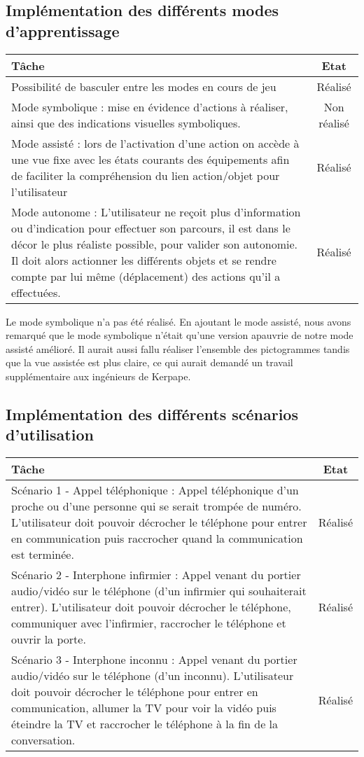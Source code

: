 \subsection{Implémentation des différents modes d'apprentissage}
\begin{tabular}{|p{13cm}|c|}
	\hline
	Tâche & Etat \\ \hline
	Possibilité de basculer entre les modes en cours de jeu & Réalisé \\ \hline
	Mode symbolique : mise en évidence d'actions à réaliser, ainsi que des indications visuelles symboliques. & Non réalisé \\ \hline
	Mode assisté : lors de l'activation d'une action on accède à une vue fixe avec les états courants des équipements afin de faciliter la compréhension du lien action/objet pour l'utilisateur & Réalisé \\ \hline
	Mode autonome : L'utilisateur ne reçoit plus d'information ou d'indication pour effectuer son parcours, il est dans le décor le plus réaliste possible, pour valider son autonomie. Il doit alors actionner les différents objets et se rendre compte par lui même (déplacement) des actions qu'il a effectuées.  & Réalisé \\ \hline
\end{tabular}
Le mode symbolique n'a pas été réalisé. En ajoutant le mode assisté, nous avons remarqué que le mode symbolique n'était qu'une version apauvrie de notre mode assisté amélioré. Il aurait aussi fallu réaliser l'ensemble des pictogrammes tandis que la vue assistée est plus claire, ce qui aurait demandé un travail supplémentaire aux ingénieurs de Kerpape.

\subsection{Implémentation des différents scénarios d'utilisation}		
\begin{tabular}{|p{13cm}|c|}
	\hline
	Tâche & Etat \\ \hline
	Scénario 1 - Appel téléphonique : Appel téléphonique d'un proche ou d'une personne qui se serait trompée de numéro. L'utilisateur doit pouvoir décrocher le téléphone pour entrer en communication puis raccrocher quand la communication est terminée. & Réalisé \\ \hline
	Scénario 2 - Interphone infirmier : Appel venant du portier audio/vidéo sur le téléphone (d'un infirmier qui souhaiterait entrer). L'utilisateur doit pouvoir décrocher le téléphone, communiquer avec l'infirmier, raccrocher le téléphone et ouvrir la porte.& Réalisé \\ \hline
	Scénario 3 - Interphone inconnu : Appel venant du portier audio/vidéo sur le téléphone (d'un inconnu). L'utilisateur doit pouvoir décrocher le téléphone pour entrer en communication, allumer la TV pour voir la vidéo puis éteindre la TV et raccrocher le téléphone à la fin de la conversation.& Réalisé \\ \hline
\end{tabular}
		


